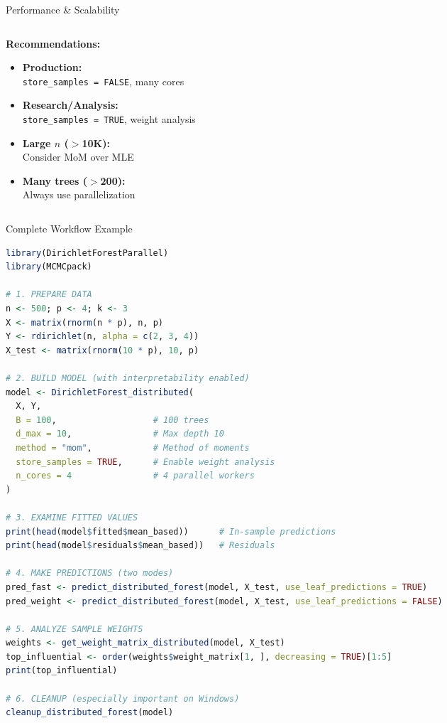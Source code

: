 \documentclass[aspectratio=169]{beamer}
\begin{document}
\begin{frame}{Performance & Scalability}
\begin{columns}[T]
\begin{column}{0.48\textwidth}
\vspace{0.3cm}

\textbf{Recommendations:}

\begin{itemize}
\item \textbf{Production:} \\
\texttt{store\_samples = FALSE}, many cores
\item \textbf{Research/Analysis:} \\
\texttt{store\_samples = TRUE}, weight analysis
\item \textbf{Large $n$ ($>$10K):} \\
Consider MoM over MLE
\item \textbf{Many trees ($>$200):} \\
Always use parallelization
\end{itemize}

\end{column}

\end{columns}

\end{frame}

\begin{frame}[fragile]{Complete Workflow Example}

\begin{lstlisting}[language=R, basicstyle=\tiny\ttfamily]
library(DirichletForestParallel)
library(MCMCpack)

# 1. PREPARE DATA
n <- 500; p <- 4; k <- 3
X <- matrix(rnorm(n * p), n, p)
Y <- rdirichlet(n, alpha = c(2, 3, 4))
X_test <- matrix(rnorm(10 * p), 10, p)

# 2. BUILD MODEL (with interpretability enabled)
model <- DirichletForest_distributed(
  X, Y, 
  B = 100,                   # 100 trees
  d_max = 10,                # Max depth 10
  method = "mom",            # Method of moments
  store_samples = TRUE,      # Enable weight analysis
  n_cores = 4                # 4 parallel workers
)

# 3. EXAMINE FITTED VALUES
print(head(model$fitted$mean_based))      # In-sample predictions
print(head(model$residuals$mean_based))   # Residuals

# 4. MAKE PREDICTIONS (two modes)
pred_fast <- predict_distributed_forest(model, X_test, use_leaf_predictions = TRUE)
pred_weight <- predict_distributed_forest(model, X_test, use_leaf_predictions = FALSE)

# 5. ANALYZE SAMPLE WEIGHTS
weights <- get_weight_matrix_distributed(model, X_test)
top_influential <- order(weights$weight_matrix[1, ], decreasing = TRUE)[1:5]
print(top_influential)

# 6. CLEANUP (especially important on Windows)
cleanup_distributed_forest(model)
\end{lstlisting}

\end{frame}
\end{document}
